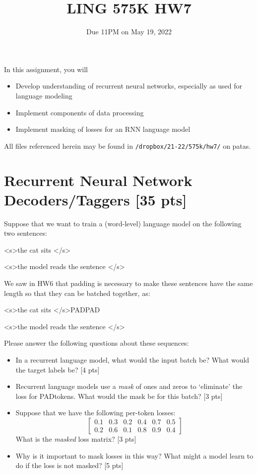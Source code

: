 \documentclass[11pt]{article}
\newcommand{\bos}{\textless s\textgreater\:}
\newcommand{\eos}{\textless /s\textgreater\:}
\newcommand{\pad}{PAD\:}
\begin{document}
\title{LING 575K HW7}
\date{\vspace{-0.2in}Due 11PM on May 19, 2022}
\maketitle


\noindent In this assignment, you will 
\begin{itemize}
  \item Develop understanding of recurrent neural networks, especially as used for language modeling
  \item Implement components of data processing 
  \item Implement masking of losses for an RNN language model
\end{itemize}
All files referenced herein may be found in \texttt{/dropbox/21-22/575k/hw7/} on patas.


\section{Recurrent Neural Network Decoders/Taggers [35 pts]}

  Suppose that we want to train a (word-level) language model on the following two sentences:
\begin{center}
  \bos the cat sits \eos

  \bos the model reads the sentence \eos
\end{center}
We saw in HW6 that padding is necessary to make these sentences have the same length so that they can be batched together, as:
\begin{center}
  \bos the cat sits \eos \pad \pad

  \bos the model reads the sentence \eos
\end{center}
Please answer the following questions about these sequences:
\begin{itemize}
  \item In a recurrent language model, what would the input batch be?  What would the target labels be? \hfill [4 pts]
  \item Recurrent language models use a \emph{mask} of ones and zeros to `eliminate' the loss for \pad tokens.  What would the mask be for this batch? \hfill [3 pts]
  \item Suppose that we have the following per-token losses:
    \[ \begin{bmatrix} 0.1 & 0.3 & 0.2 & 0.4 & 0.7 & 0.5 \\ 0.2 & 0.6 & 0.1 & 0.8 & 0.9 & 0.4 \end{bmatrix} \]
    What is the \emph{masked} loss matrix? \hfill [3 pts]
  \item Why is it important to mask losses in this way?  What might a model learn to do if the loss is not masked? \hfill [5 pts]
\end{itemize}
\end{document}
